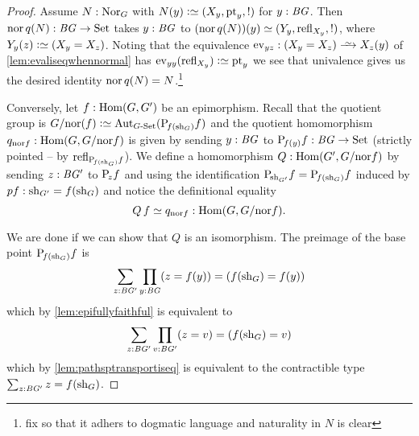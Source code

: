 \begin{proof}
  Assume $N:\mathrm{Nor}_G$ with $N(y)\defequi(X_y,\pt_y,!)$ for $y:\mathit{B}\mathit{G}$.
  Then $\nor\, q(N):\BG\to\Set$ takes $y:\mathit{B}\mathit{G}$ to $(\nor\, q(N))(y)\oldequiv(Y_y,\refl{X_y},!)$, where $Y_y(z)\defequi (X_y=X_z)$.
  Noting that the equivalence $\mathrm{ev}_{yz}:(X_y=X_z)\we X_z(y)$ of \cref{lem:evaliseqwhennormal} has $\mathrm{ev}_{yy}(\refl{X_y})\defequi \pt_y$ we see that univalence gives us the desired identity $\nor\, q(N)=N$.\footnote{fix so that it adhers to dogmatic language and naturality in $N$ is clear}

  Conversely, let $f:\Hom(G,G')$ be an epimorphism.
  Recall that the quotient group is $G/\nor(f)\defequi\aut_{G\text{-}\Set}(\pathsp{f(\shape_G)}f)$ and the quotient homomorphism $q_{\nor f}:\Hom(G,G/\nor f)$ is given by sending $y:\mathit{B}\mathit{G}$ to $\mathrm{P}_{\!f(y)}f:\mathit{B}\mathit{G}\to\mathrm{Set}$ (strictly pointed -- \ie by $\mathrm{refl}_{\mathrm{P}_{\!f(\mathrm{sh}_G)}f}$).
  We define a homomorphism $Q:\Hom(G',G/\nor f)$ by sending $z:\mathit{B}\mathit{G}'$ to $\mathrm{P}_{\!z}f$ and using the identification $\mathrm{P}_{\!\mathrm{sh}_{G'}}f=\mathrm{P}_{\!f(\mathrm{sh}_G)}f$ induced by $pf:\mathrm{sh}_{G'}=f(\mathrm{sh}_G)$ and notice the definitional equality
  $$Q\,f\oldequiv q_{\nor f}:\Hom(G,G/\nor f).$$

We are done if we can show that $Q$ is an isomorphism.
The preimage of the base point $\mathrm{P}_{\!f(\mathrm{sh}_G)}f$ is
$$\sum_{z:\mathit{B}\mathit{G}'}\prod_{y:\mathit{B}\mathit{G}}(z=f(y))=(f(\mathrm{sh}_G)=f(y))$$
which by
\cref{lem:epifullyfaithful} is equivalent to
$$\sum_{z:\mathit{B}\mathit{G}'}\prod_{v:\mathit{B}\mathit{G}'}(z=v)=(f(\mathrm{sh}_G)=v)$$
which by \cref{lem:pathsptransportiseq} is equivalent to the contractible type $\sum_{z:\mathit{B}\mathit{G}'}z=f(\mathrm{sh}_G)$.
\end{proof}

